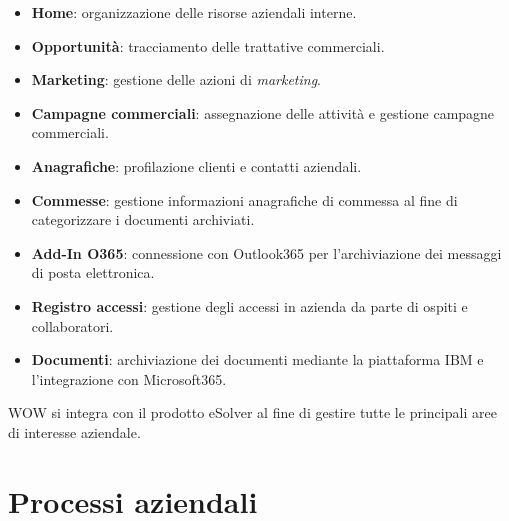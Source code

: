 \begin{itemize}
    \item \textbf{Home}: organizzazione delle risorse aziendali interne. 
    \item \textbf{Opportunità}: tracciamento delle trattative commerciali. 
    \item \textbf{Marketing}: gestione delle azioni di \emph{marketing}. 
    \item \textbf{Campagne commerciali}: assegnazione delle attività e gestione campagne commerciali.
    \item \textbf{Anagrafiche}: profilazione clienti e contatti aziendali. 
    \item \textbf{Commesse}: gestione informazioni anagrafiche di commessa al fine di categorizzare i documenti archiviati.
    \item \textbf{Add-In O365}: connessione con Outlook365 per l'archiviazione dei messaggi di posta elettronica.
    \item \textbf{Registro accessi}: gestione degli accessi in azienda da parte di ospiti e collaboratori.
    \item \textbf{Documenti}: archiviazione dei documenti mediante la piattaforma IBM e l'integrazione con Microsoft365.\\
\end{itemize}
\gls{WOW} si integra con il prodotto eSolver al fine di gestire tutte le principali aree di interesse aziendale. 

\section{Processi aziendali}
